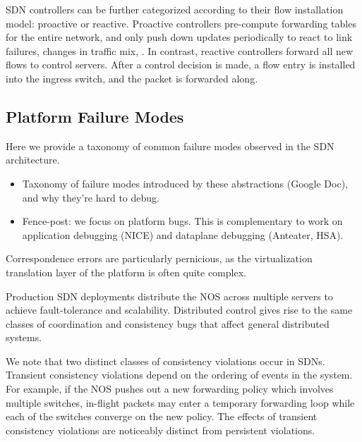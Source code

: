 SDN controllers can be further categorized according to their flow
installation model: proactive or reactive.
Proactive controllers pre-compute forwarding tables for the entire network,
and only push down updates periodically to react to link failures, changes in
traffic mix, \etc. In contrast, reactive controllers forward all new flows to
control servers. After a control decision is made, a flow entry is installed
into the ingress switch, and the packet is forwarded along.

\subsection{Platform Failure Modes}

Here we provide a taxonomy of common failure modes observed in
the SDN architecture.

\begin{itemize}
\item Taxonomy of failure modes introduced by these abstractions (Google Doc),
and why they're hard to debug.
\item Fence-post: we focus on platform bugs. This is complementary to work on
application debugging (NICE) and dataplane debugging (Anteater, HSA).
\end{itemize}


Correspondence errors are particularly pernicious, as the 
virtualization translation layer of the platform is often quite complex. 

Production SDN deployments distribute the NOS  across multiple servers to achieve fault-tolerance
and scalability. Distributed control gives rise to the same classes of coordination
and consistency bugs that affect general distributed systems. 

We note that two distinct classes of consistency violations occur in SDNs.
Transient consistency violations depend on the ordering of events in the system. For example,
if the  NOS pushes out a new forwarding policy
which involves multiple switches, in-flight packets may enter a
temporary forwarding loop while each of the switches converge on the new policy.
The effects of transient
consistency violations are noticeably distinct from persistent violations.
